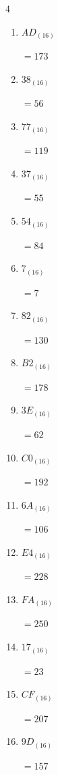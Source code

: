 \begin{multicols}{4}
\begin{enumerate}
\columnbreak %

  \item $AD_{(16)}$

        $=173$

  \item $38_{(16)}$

        $=56$

  \item $77_{(16)}$

        $=119$

  \item $37_{(16)}$

        $=55$

  \item $54_{(16)}$

        $=84$

  \item $7_{(16)}$

        $=7$

  \item $82_{(16)}$

        $=130$

  \item $B2_{(16)}$

        $=178$

  \item $3E_{(16)}$

        $=62$

  \item $C0_{(16)}$

        $=192$

  \item $6A_{(16)}$

        $=106$

  \item $E4_{(16)}$

        $=228$

  \item $FA_{(16)}$

        $=250$

  \item $17_{(16)}$

        $=23$

  \item $CF_{(16)}$

        $=207$

\columnbreak %

  \item $9D_{(16)}$

        $=157$


\end{enumerate}
\end{multicols}
